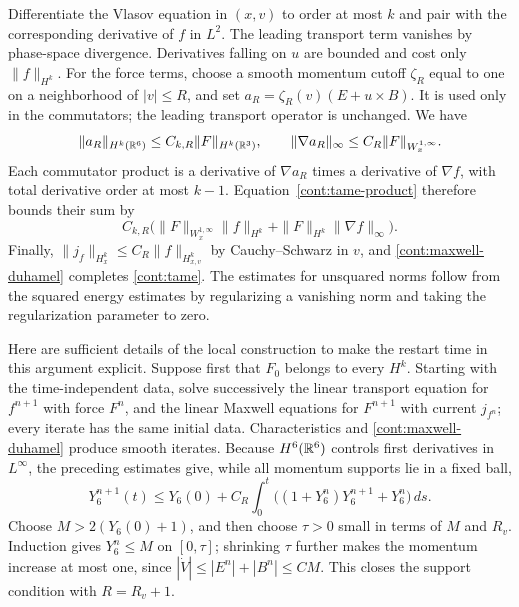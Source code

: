Differentiate the Vlasov equation in $(x,v)$ to order at most $k$ and
pair with the corresponding derivative of $f$ in $L^2$.
The leading transport term vanishes by phase-space divergence.
Derivatives falling on $u$ are bounded and cost only $\|f\|_{H^k}$.
For the force terms, choose a smooth momentum cutoff $\zeta_R$ equal
to one on a neighborhood of $|v|\le R$, and set
$a_R=\zeta_R(v)(E+u\times B)$.
It is used only in the commutators; the leading transport operator is
unchanged.  We have
\[
 \|a_R\|_{H^k(\mathbb R^6)}\le C_{k,R}\|F\|_{H^k(\mathbb R^3)},\qquad
 \|\nabla a_R\|_\infty\le C_R\|F\|_{W^{1,\infty}_x}.
\]
Each commutator product is a derivative of $\nabla a_R$ times a
derivative of $\nabla f$, with total derivative order at most $k-1$.
Equation~\eqref{cont:tame-product} therefore bounds their sum by
\[
 C_{k,R}\bigl(\|F\|_{W^{1,\infty}_x}\|f\|_{H^k}
             +\|F\|_{H^k}\|\nabla f\|_\infty\bigr).
\]
Finally, $\|j_f\|_{H^k_x}\le C_R\|f\|_{H^k_{x,v}}$ by
Cauchy--Schwarz in $v$, and \eqref{cont:maxwell-duhamel} completes
\eqref{cont:tame}.  The estimates for unsquared norms follow from the
squared energy estimates by regularizing a vanishing norm and taking
the regularization parameter to zero.

Here are sufficient details of the local construction to make the
restart time in this argument explicit.  Suppose first that $F_0$
belongs to every $H^k$.  Starting with the time-independent data, solve
successively the linear transport equation for $f^{n+1}$ with force
$F^n$, and the linear Maxwell equations for $F^{n+1}$ with current
$j_{f^n}$; every iterate has the same initial data.
Characteristics and \eqref{cont:maxwell-duhamel} produce smooth iterates.
Because $H^6(\mathbb R^6)$ controls first derivatives in $L^\infty$, the
preceding estimates give, while all momentum supports lie in a fixed
ball,
\[
 Y_6^{n+1}(t)\le Y_6(0)+C_R\int_0^t
       \bigl((1+Y_6^n)Y_6^{n+1}+Y_6^n\bigr)\,ds.
\]
Choose $M>2(Y_6(0)+1)$, and then choose $\tau>0$ small in terms of
$M$ and $R_v$.  Induction gives $Y_6^n\le M$ on $[0,\tau]$;
shrinking $\tau$ further makes the momentum increase at most one,
since $|\dot V|\le |E^n|+|B^n|\le C M$.
This closes the support condition with $R=R_v+1$.


